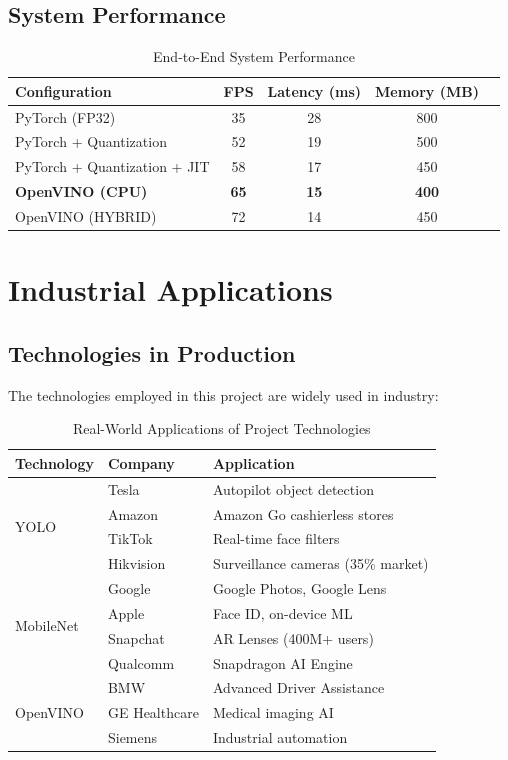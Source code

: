 \documentclass[12pt,a4paper]{article}
\begin{document}
\subsection{System Performance}

\begin{table}[H]
\centering
\caption{End-to-End System Performance}
\begin{tabular}{lcccc}
\toprule
\textbf{Configuration} & \textbf{FPS} & \textbf{Latency (ms)} & \textbf{Memory (MB)} \\
\midrule
PyTorch (FP32) & 35 & 28 & 800 \\
PyTorch + Quantization & 52 & 19 & 500 \\
PyTorch + Quantization + JIT & 58 & 17 & 450 \\
\textbf{OpenVINO (CPU)} & \textbf{65} & \textbf{15} & \textbf{400} \\
OpenVINO (HYBRID) & 72 & 14 & 450 \\
\bottomrule
\end{tabular}
\end{table}

\section{Industrial Applications}

\subsection{Technologies in Production}

The technologies employed in this project are widely used in industry:

\begin{table}[H]
\centering
\caption{Real-World Applications of Project Technologies}
\begin{tabular}{lll}
\toprule
\textbf{Technology} & \textbf{Company} & \textbf{Application} \\
\midrule
\multirow{4}{*}{YOLO} & Tesla & Autopilot object detection \\
 & Amazon & Amazon Go cashierless stores \\
 & TikTok & Real-time face filters \\
 & Hikvision & Surveillance cameras (35\% market) \\
\midrule
\multirow{4}{*}{MobileNet} & Google & Google Photos, Google Lens \\
 & Apple & Face ID, on-device ML \\
 & Snapchat & AR Lenses (400M+ users) \\
 & Qualcomm & Snapdragon AI Engine \\
\midrule
\multirow{3}{*}{OpenVINO} & BMW & Advanced Driver Assistance \\
 & GE Healthcare & Medical imaging AI \\
 & Siemens & Industrial automation \\
\bottomrule
\end{tabular}
\end{table}
\end{document}
